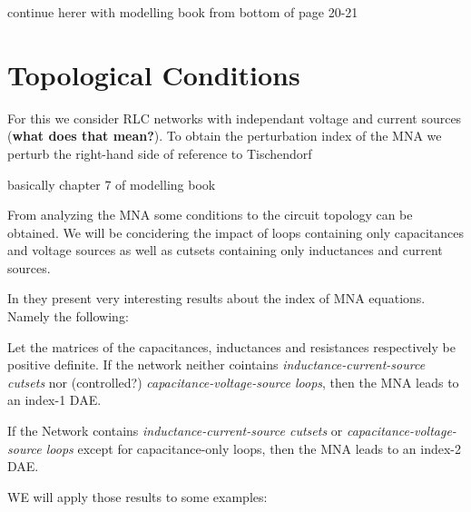 continue herer with modelling book from bottom of page 20-21

\section{Topological Conditions}
For this we consider RLC networks with independant voltage and current sources (\textbf{what does that mean?}). To obtain the perturbation index of the MNA we perturb the right-hand side of  
\newline reference to Tischendorf



basically chapter 7 of modelling book

From analyzing the MNA some conditions to the circuit topology can be obtained. We will be concidering the impact of loops containing only capacitances and voltage sources as well as cutsets containing only inductances and current sources.

In \cite{Tischendorf2005Topological} they present very interesting results about the index of MNA equations. Namely the following:


\begin{theorem} \cite{Tischendorf2004Topological}
	Let the matrices of the capacitances, inductances and resistances respectively be positive definite. If the network neither cointains \emph{inductance-current-source cutsets} nor (controlled?) \emph{capacitance-voltage-source loops}, then the MNA leads to an index-1 DAE.
\end{theorem}

\begin{theorem} \cite{Tischendorf2004Topological}
	If the Network contains \emph{inductance-current-source cutsets} or \emph{capacitance-voltage-source loops} except for capacitance-only loops, then the MNA leads to an index-2 DAE.
\end{theorem}

WE will apply those results to some examples: